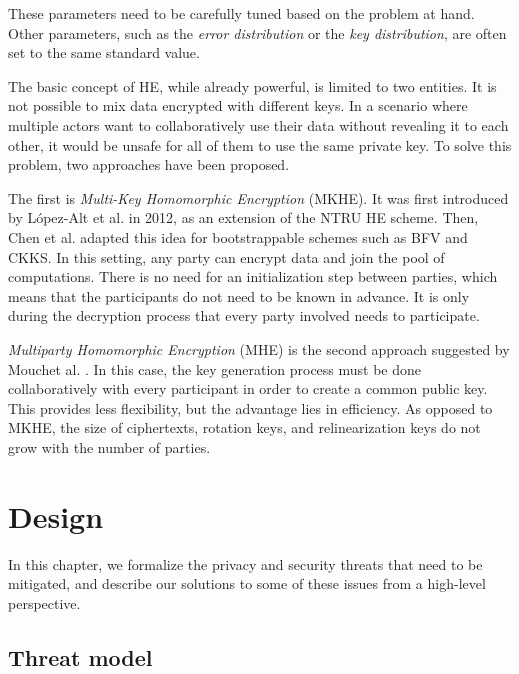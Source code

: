 \documentclass[a4paper,11pt,oneside]{report}
\begin{document}
These parameters need to be carefully tuned based on the problem at hand. 
Other parameters, such as the \emph{error distribution} or the \emph{key distribution}, are often set to the same standard value.

The basic concept of HE, while already powerful, is limited to two entities.
It is not possible to mix data encrypted with different keys.
In a scenario where multiple actors want to collaboratively use their data without revealing it to each other, it would be unsafe for all of them to use the same private key.
To solve this problem, two approaches have been proposed.

The first is \emph{Multi-Key Homomorphic Encryption} (MKHE).
It was first introduced by López-Alt et al. \cite{lopez-alt_--fly_2012} in 2012, as an extension of the NTRU HE scheme. 
Then, Chen et al. \cite{chen_efficient_2019} adapted this idea for bootstrappable schemes such as BFV and CKKS.
In this setting, any party can encrypt data and join the pool of computations.
There is no need for an initialization step between parties, which means that the participants do not need to be known in advance.
It is only during the decryption process that every party involved needs to participate.

\emph{Multiparty Homomorphic Encryption} (MHE) is the second approach suggested by Mouchet al. \cite{mouchet_multiparty_2021}.
In this case, the key generation process must be done collaboratively with every participant in order to create a common public key.
This provides less flexibility, but the advantage lies in efficiency.
As opposed to MKHE, the size of ciphertexts, rotation keys, and relinearization keys do not grow with the number of parties.


\chapter{Design}



In this chapter, we formalize the privacy and security threats that need to be mitigated, and describe our solutions to some of these issues from a high-level perspective.

\section{Threat model}
\end{document}

